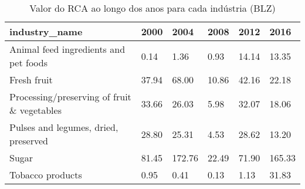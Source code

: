 \begin{table}
\centering
\caption{Valor do RCA ao longo dos anos para cada indústria (BLZ)}
\begin{tabular}{p{6cm}p{1.5cm}p{1.5cm}p{1.5cm}p{1.5cm}p{1.5cm}}
\toprule
                              industry\_name &  2000 &   2004 &  2008 &  2012 &   2016 \\
\midrule
      Animal feed ingredients and pet foods &  0.14 &   1.36 &  0.93 & 14.14 &  13.35 \\
                                Fresh fruit & 37.94 &  68.00 & 10.86 & 42.16 &  22.18 \\
Processing/preserving of fruit \& vegetables & 33.66 &  26.03 &  5.98 & 32.07 &  18.06 \\
       Pulses and legumes, dried, preserved & 28.80 &  25.31 &  4.53 & 28.62 &  13.20 \\
                                      Sugar & 81.45 & 172.76 & 22.49 & 71.90 & 165.33 \\
                           Tobacco products &  0.95 &   0.41 &  0.13 &  1.13 &  31.83 \\
\bottomrule
\end{tabular}
\end{table}
